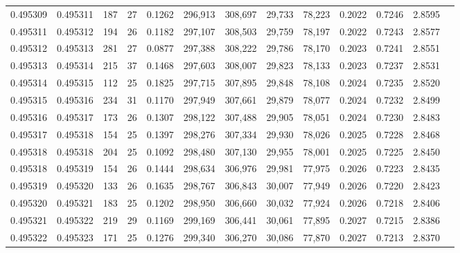 \begin{tabular}{rrrrrrrrrrrrr}
0.495309 & 0.495311 & 187 &  27 &                                     0.1262 & 296,913 & 308,697 &  29,733 &  78,223 & 0.2022 & 0.7246 & 2.8595 \\
0.495311 & 0.495312 & 194 &  26 &                                     0.1182 & 297,107 & 308,503 &  29,759 &  78,197 & 0.2022 & 0.7243 & 2.8577 \\
0.495312 & 0.495313 & 281 &  27 &                                     0.0877 & 297,388 & 308,222 &  29,786 &  78,170 & 0.2023 & 0.7241 & 2.8551 \\
0.495313 & 0.495314 & 215 &  37 &                                     0.1468 & 297,603 & 308,007 &  29,823 &  78,133 & 0.2023 & 0.7237 & 2.8531 \\
0.495314 & 0.495315 & 112 &  25 &                                     0.1825 & 297,715 & 307,895 &  29,848 &  78,108 & 0.2024 & 0.7235 & 2.8520 \\
0.495315 & 0.495316 & 234 &  31 &                                     0.1170 & 297,949 & 307,661 &  29,879 &  78,077 & 0.2024 & 0.7232 & 2.8499 \\
0.495316 & 0.495317 & 173 &  26 &                                     0.1307 & 298,122 & 307,488 &  29,905 &  78,051 & 0.2024 & 0.7230 & 2.8483 \\
0.495317 & 0.495318 & 154 &  25 &                                     0.1397 & 298,276 & 307,334 &  29,930 &  78,026 & 0.2025 & 0.7228 & 2.8468 \\
0.495318 & 0.495318 & 204 &  25 &                                     0.1092 & 298,480 & 307,130 &  29,955 &  78,001 & 0.2025 & 0.7225 & 2.8450 \\
0.495318 & 0.495319 & 154 &  26 &                                     0.1444 & 298,634 & 306,976 &  29,981 &  77,975 & 0.2026 & 0.7223 & 2.8435 \\
0.495319 & 0.495320 & 133 &  26 &                                     0.1635 & 298,767 & 306,843 &  30,007 &  77,949 & 0.2026 & 0.7220 & 2.8423 \\
0.495320 & 0.495321 & 183 &  25 &                                     0.1202 & 298,950 & 306,660 &  30,032 &  77,924 & 0.2026 & 0.7218 & 2.8406 \\
0.495321 & 0.495322 & 219 &  29 &                                     0.1169 & 299,169 & 306,441 &  30,061 &  77,895 & 0.2027 & 0.7215 & 2.8386 \\
0.495322 & 0.495323 & 171 &  25 &                                     0.1276 & 299,340 & 306,270 &  30,086 &  77,870 & 0.2027 & 0.7213 & 2.8370 \\

\end{tabular}
